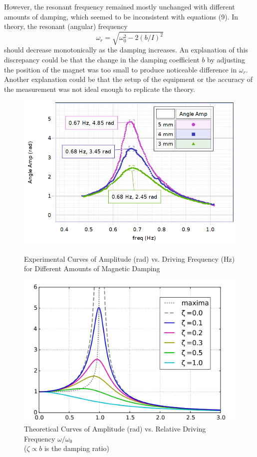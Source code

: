 However, the resonant frequency remained mostly unchanged with different amounts of damping, which seemed to be inconsistent with equations (9). In theory, the resonant (angular) frequency 
\begin{equation}
\omega_r = \sqrt{\omega_0^2-2(b/I)^2}
\end{equation}
should decrease monotonically as the damping increases. An explanation of this discrepancy could be that the change in the damping coefficient $b$ by adjusting the position of the magnet was too small to produce noticeable difference in $\omega_r$. Another explanation could be that the setup of the equipment or the accuracy of the measurement was not ideal enough to replicate the theory.
\begin{figure}[h]
	\begin{minipage}[c]{0.46\linewidth}
		\includegraphics[width=\linewidth]{res}
		\caption{Experimental Curves of Amplitude (rad) vs. Driving Frequency (Hz) for Different Amounts of Magnetic Damping}
	\end{minipage}
	\hfill
	\begin{minipage}[c]{0.48\linewidth}
		\includegraphics[width=\linewidth]{theo}
		\caption{Theoretical Curves of Amplitude (rad) vs. Relative Driving Frequency $\omega/\omega_0$ 
			\\($\zeta \propto b$ is the damping ratio)}
	\end{minipage}%
\end{figure}

